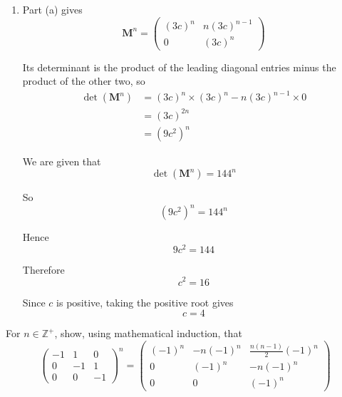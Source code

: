 \documentclass[leqno]{article}
\begin{document}
\begin{enumerate}[
  label=\textbf{\arabic*.},
  leftmargin=*,
  topsep=0pt,
  partopsep=0pt,
  parsep=0pt
]
\begin{djsSolution}
\begin{enumerate}[label=\textbf{(\alph*)}]
  This is exactly the required form, so the statement is true for $n=k+1$.

  \textbf{Conclusion:} If the statement is true for $n=k$, then it is true for $n=k+1$. Since it is true for $n=1$, by the principle of mathematical induction the statement is true for all positive integers $n$.

  \item Part (a) gives
  \[
  \mathbf{M}^n=\begin{pmatrix}(3c)^n & n(3c)^{n-1}\\0&(3c)^n\end{pmatrix}
  \]

  Its determinant is the product of the leading diagonal entries minus the product of the other two, so
  \begin{align*}
  \det(\mathbf{M}^n)
  &= (3c)^n\times(3c)^n-n(3c)^{n-1}\times0 \\
  &= (3c)^{2n} \\
  &= (9c^2)^n
  \end{align*}

  We are given that
  \[
  \det(\mathbf{M}^n)=144^n
  \]

  So
  \[
  (9c^2)^n=144^n
  \]

  Hence
  \[
  9c^2=144
  \]

  Therefore
  \[
  c^2=16
  \]

  Since $c$ is positive, taking the positive root gives
  \[
  c=4
  \]

\end{enumerate}
\end{djsSolution}


\newpage

\questionitem

For $n \in \mathbb{Z}^{+}$, show, using mathematical induction, that
\[
\renewcommand{\arraystretch}{1.4}
\begin{pmatrix}

-1 & 1 & 0 \\
0 & -1 & 1 \\
0 & 0 & -1
\end{pmatrix}^{n}
=
\begin{pmatrix}
(-1)^{n} & -n(-1)^{n} & \frac{n(n-1)}{2}(-1)^{n} \\
0 & (-1)^{n} & -n(-1)^{n} \\
0 & 0 & (-1)^{n}
\end{pmatrix}
\]


\end{enumerate}
\end{document}

